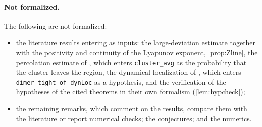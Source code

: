 \paragraph{Not formalized.}  The following are not formalized:
\begin{itemize}
\item the literature results entering as inputs: the large-deviation estimate together with the
positivity and continuity of the Lyapunov exponent, \cref{prop:Zline}, the percolation estimate of
\cite{LiL2022}, which enters \texttt{cluster\_avg} as the probability that the cluster leaves the
region, the dynamical localization of \cite{DeBievreGerminet2000}, which enters \texttt{dimer\_tight\_of\_dynLoc}
as a hypothesis, and the verification of the hypotheses of the cited theorems in their own formalism
(\cref{lem:hypcheck});
\item the remaining remarks, which comment on the results, compare them with the literature or report numerical
checks; the conjectures; and the numerics.
\end{itemize}

